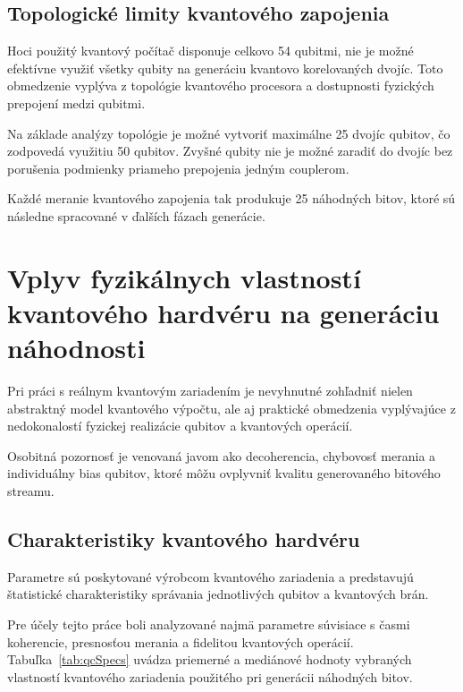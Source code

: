 \subsection{Topologické limity kvantového zapojenia}

Hoci použitý kvantový počítač disponuje celkovo 54 qubitmi, nie je možné efektívne využiť všetky qubity na generáciu kvantovo korelovaných dvojíc.
Toto obmedzenie vyplýva z topológie kvantového procesora a dostupnosti fyzických prepojení medzi qubitmi.

Na základe analýzy topológie je možné vytvoriť maximálne 25 dvojíc qubitov, čo zodpovedá využitiu 50 qubitov.
Zvyšné qubity nie je možné zaradiť do dvojíc bez porušenia podmienky priameho prepojenia jedným couplerom.

Každé meranie kvantového zapojenia tak produkuje 25 náhodných bitov, ktoré sú následne spracované v ďalších fázach generácie.




\section{Vplyv fyzikálnych vlastností kvantového hardvéru na generáciu náhodnosti}

Pri práci s reálnym kvantovým zariadením je nevyhnutné zohľadniť nielen abstraktný model kvantového výpočtu, ale aj praktické obmedzenia vyplývajúce z nedokonalostí fyzickej realizácie qubitov a kvantových operácií.

Osobitná pozornosť je venovaná javom ako decoherencia, chybovosť merania a individuálny bias qubitov, ktoré môžu ovplyvniť kvalitu generovaného bitového streamu.

\subsection{Charakteristiky kvantového hardvéru}

Parametre sú poskytované výrobcom kvantového zariadenia a predstavujú štatistické charakteristiky správania jednotlivých qubitov a kvantových brán.

Pre účely tejto práce boli analyzované najmä parametre súvisiace s časmi koherencie, presnosťou merania a fidelitou kvantových operácií.
Tabuľka~\ref{tab:qcSpecs} uvádza priemerné a mediánové hodnoty vybraných vlastností kvantového zariadenia použitého pri generácii náhodných bitov.

